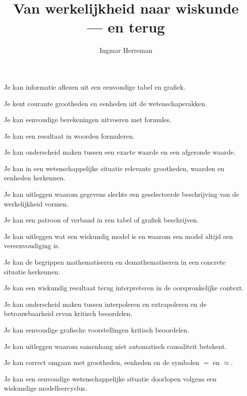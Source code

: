 \documentclass{ximera}
\title{Van werkelijkheid naar wiskunde --- en terug}
\author{Ingmar Herreman}
\begin{document}

\maketitle



\begin{voorkennis}
  \item Je kan informatie aflezen uit een eenvoudige tabel en grafiek.
  \item Je kent courante grootheden en eenheden uit de wetenschapsvakken.
  \item Je kan eenvoudige berekeningen uitvoeren met formules.
  \item Je kan een resultaat in woorden formuleren.
  \item Je kan onderscheid maken tussen een exacte waarde en een afgeronde waarde.
\end{voorkennis}

\begin{leerdoelen}
  \item Je kan in een wetenschappelijke situatie relevante grootheden, waarden en eenheden herkennen.
  \item Je kan uitleggen waarom gegevens slechts een geselecteerde beschrijving van de werkelijkheid vormen.
  \item Je kan een patroon of verband in een tabel of grafiek beschrijven.
  \item Je kan uitleggen wat een wiskundig model is en waarom een model altijd een vereenvoudiging is.
  \item Je kan de begrippen mathematiseren en demathematiseren in een concrete situatie herkennen.
  \item Je kan een wiskundig resultaat terug interpreteren in de oorspronkelijke context.
  \item Je kan onderscheid maken tussen interpoleren en extrapoleren en de betrouwbaarheid ervan kritisch beoordelen.
  \item Je kan eenvoudige grafische voorstellingen kritisch beoordelen.
  \item Je kan uitleggen waarom samenhang niet automatisch causaliteit betekent.
  \item Je kan correct omgaan met grootheden, eenheden en de symbolen $=$ en $\approx$.
  \item Je kan een eenvoudige wetenschappelijke situatie doorlopen volgens een wiskundige modelleercyclus.
\end{leerdoelen}
\end{document}
